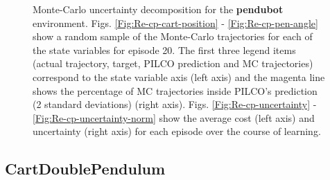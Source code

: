 \begin{figure}[htp!]
\begin{subfigure}[b]{0.48\linewidth}
    \label{Fig:Re-pen-uncertainty-norm} 
  \end{subfigure} 
\caption[Monte-Carlo uncertainty decomposition for for \textbf{pendubot} environment]{Monte-Carlo uncertainty decomposition for the \textbf{pendubot} environment. Figs. \ref{Fig:Re-cp-cart-position} - \ref{Fig:Re-cp-pen-angle} show a random sample of the Monte-Carlo trajectories for each of the state variables for episode 20. The first three legend items (actual trajectory, target, PILCO prediction and MC trajectories) correspond to the state variable axis (left axis) and the magenta line shows the percentage of MC trajectories inside PILCO's prediction (2 standard deviations) (right axis). Figs. \ref{Fig:Re-cp-uncertainty} - \ref{Fig:Re-cp-uncertainty-norm} show the average cost (left axis) and uncertainty (right axis) for each episode over the course of learning.}
\label{Fig:Re-Pendubot-Full-Results} 
\end{figure}

\subsection{CartDoublePendulum}


